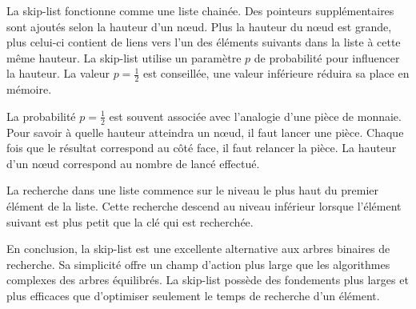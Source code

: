 \documentclass[hidelinks,a4paper, 12pt]{article}
\begin{document}
	La skip-list fonctionne comme une liste chainée. Des pointeurs supplémentaires sont ajoutés selon la hauteur d'un nœud. Plus la hauteur du nœud est grande, plus celui-ci contient de liens vers l'un des éléments suivants dans la liste à cette même hauteur. La skip-list utilise un paramètre $p$ de probabilité pour influencer la hauteur. La valeur $p=\frac{1}{2}$ est conseillée, une valeur inférieure réduira sa place en mémoire.
	
	La probabilité $p=\frac{1}{2}$ est souvent associée avec l'analogie d'une pièce de monnaie. Pour savoir à quelle hauteur atteindra un nœud, il faut lancer une pièce. Chaque fois que le résultat correspond au côté face, il faut relancer la pièce. La hauteur d'un nœud correspond au nombre de lancé effectué.
	
	La recherche dans une liste commence sur le niveau le plus haut du premier élément de la liste. Cette recherche descend au niveau inférieur lorsque l'élément suivant est plus petit que la clé qui est recherchée.
	
	\vspace{1cm}
	En conclusion, la skip-list est une excellente alternative aux arbres binaires de recherche. Sa simplicité offre un champ d'action plus large que les algorithmes complexes des arbres équilibrés. La skip-list possède des fondements plus larges et plus efficaces que d'optimiser seulement le temps de recherche d'un élément.
	
	
	
\end{document}
